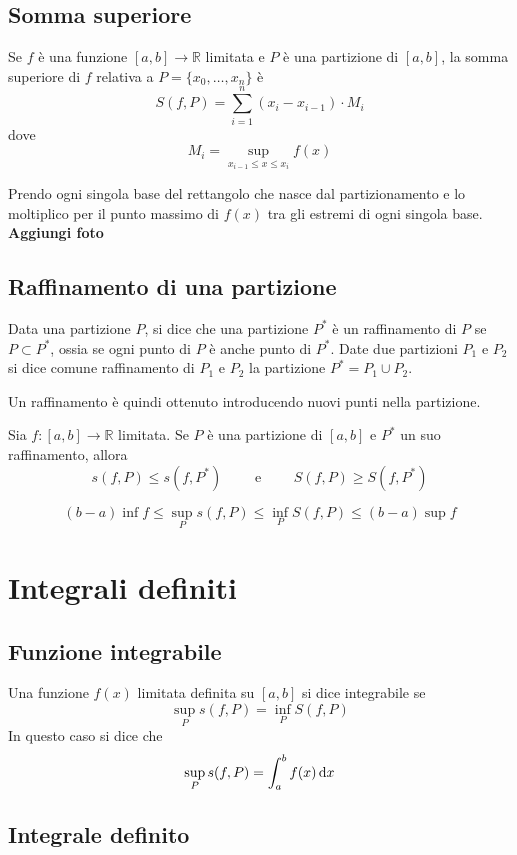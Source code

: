 \subsection{Somma superiore}
Se $f$ è una funzione $[a,b] \to \mathbb{R}$ limitata e $P$ è una partizione di $[a,b]$, la somma superiore di $f$ relativa a $P = \{x_0, \ldots, x_n\}$ è $$ S(f,P) = \sum_{i=1}^n (x_i-x_{i-1}) \cdot M_i $$ dove $$M_i = \sup_{x_{i-1} \le x \le x_i} f(x)$$

\begin{tip}
Prendo ogni singola base del rettangolo che nasce dal partizionamento e lo moltiplico per il punto massimo di $f(x)$ tra gli estremi di ogni singola base.
\textbf{Aggiungi foto}
\end{tip}

\subsection{Raffinamento di una partizione}
Data una partizione $P$, si dice che una partizione $P^*$ è un raffinamento di $P$ se $P \subset P^*$, ossia se ogni punto di $P$ è anche punto di $P^*$. Date due partizioni $P_1$ e $P_2$ si dice comune raffinamento di $P_1$ e $P_2$ la partizione $P^* = P_1 \cup P_2$.

\begin{tip}
Un raffinamento è quindi ottenuto introducendo nuovi punti nella partizione.
\end{tip}

Sia $f:[a,b] \to \mathbb{R}$ limitata. Se $P$ è una partizione di $[a,b]$ e $P^*$ un suo raffinamento, allora $$
s(f,P) \le s(f, P^*) \qquad \text{ e } \qquad S(f,P) \ge S(f,P^*) $$

$$(b-a) \inf f \le \sup_P s(f,P) \le \inf_P S(f,P) \le (b-a) \sup f$$
\section{Integrali definiti}

\subsection{Funzione integrabile}

Una funzione $f(x)$ limitata definita su $[a,b]$ si dice integrabile se $$ \sup_P s(f,P) = \inf_P S(f,P) $$ In questo caso si dice che $$\sup_P s(f,P) = \int_a^b f(x) \mathop{}\!\mathrm{d} x$$


\subsection{Integrale definito}

